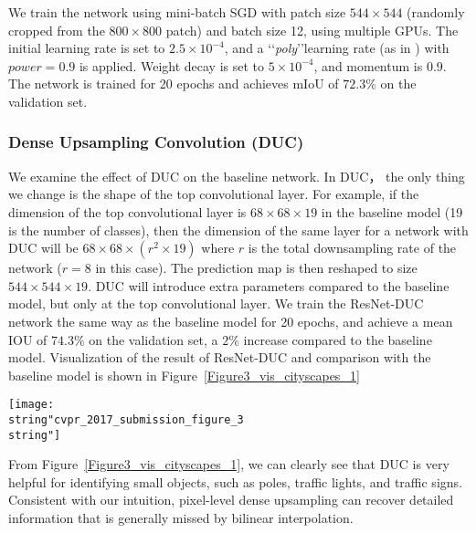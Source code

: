 \documentclass[10pt,twocolumn,letterpaper]{article}
\begin{document}
We train the network using mini-batch SGD with patch size $544\times 544$ (randomly cropped from the $800\times 800$ patch) and batch size 12, using multiple GPUs. The initial learning rate is set to $2.5\times 10^{-4}$, and a \lq\lq \textit{poly}\rq\rq   learning rate (as in \cite{chen2016deeplab}) with $power=0.9$ is applied. Weight decay is set to $5\times 10^{-4}$, and momentum is $0.9$. The network is trained for 20 epochs and achieves mIoU of $72.3\%$ on the validation set.
\vspace{-5pt}

\subsubsection{Dense Upsampling Convolution (DUC)} 
We examine the effect of DUC on the baseline network. In DUC， the only thing we change is the shape of the top convolutional layer. For example, if the dimension of the top convolutional layer is $68\times{68}\times{19}$ in the baseline model (19 is the number of classes), then the dimension of the same layer for a network with DUC will be $68\times{68}\times{(r^2\times 19)}$ where $r$ is the total downsampling rate of the network ($r=8$ in this case). The prediction map is then reshaped to size $544\times 544\times 19$. DUC will introduce extra parameters compared to the baseline model, but only at the top convolutional layer. We train the ResNet-DUC network the same way as the baseline model for 20 epochs, and achieve a mean IOU of \textbf{$74.3\%$} on the validation set, a $2\%$ increase compared to the baseline model. Visualization of the result of ResNet-DUC and comparison with the baseline model is shown in Figure~\ref{Figure3_vis_cityscapes_1}

\begin{figure*}[ht]
\begin{center}
\texttt{[image: \\string"cvpr\_2017\_submission\_figure\_3\\string"]}
\end{center}
\caption{Effect of Dense Upsampling Convolution (DUC) on the Cityscapes validation set. From left to right: input image, ground truth (areas with black color are ignored in evaluation), baseline model, and our ResNet-DUC model. }
\label{Figure3_vis_cityscapes_1}
\vspace{-15pt}
\end{figure*}

From Figure~\ref{Figure3_vis_cityscapes_1}, we can clearly see that DUC is very helpful for identifying small objects, such as poles, traffic lights, and traffic signs. Consistent with our intuition, pixel-level dense upsampling can recover detailed information that is generally missed by bilinear interpolation.
\end{document}
